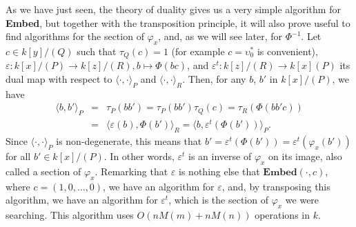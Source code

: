 \documentclass[a4paper,11pt]{article}
\theoremstyle{break}
\theoremstyle{definition}
\theoremstyle{remark}
\newcommand{\ps}[2]{\langle#1,#2\rangle}
\newcommand{\psdot}{\ps{\cdot}{\cdot}}
\begin{document}
As we have just seen, the theory of duality gives us a very simple algorithm for
\textbf{Embed}, but together with the transposition principle, it will also
prove useful to find algorithms for the section of $\varphi_x$, and, as we will
see later, for $\Phi^{-1}$. Let $c\in k[y]/(Q)$ such that $\tau_Q(c)=1$ (for
example $c=\upsilon^*_0$ is convenient), $\varepsilon:k[x]/(P)\to k[z]/(R),
b\mapsto \Phi(bc)$, and $\varepsilon^t:k[z]/(R)\to k[x](P)$ its dual map with
respect to $\psdot_P$ and $\psdot_R$. Then, for any $b$, $b'$ in $k[x]/(P)$, we
have
\[
\begin{array}{rcl}
  \ps{b}{b'}_P &=& \tau_P(bb') = \tau_P(bb')\tau_Q(c) = \tau_R(\Phi(bb'c))\\
  &=& \ps{\varepsilon(b)}{\Phi(b')}_R = \ps{b}{\varepsilon^t(\Phi(b'))}_P.
\end{array}
\]
Since $\psdot_P$ is non-degenerate, this means that 
$b'=\varepsilon^t(\Phi(b'))=\varepsilon^t(\varphi_x(b'))$ for all $b'\in 
k[x]/(P)$. In other words, $\varepsilon^t$ is an inverse of $\varphi_x$ on its 
image, also called a section of $\varphi_x$. Remarking that $\varepsilon$ is 
nothing else that $\textbf{Embed}(\cdot,c)$, where $c=(1,0,\dots,0)$, we have 
an algorithm for $\varepsilon$, and, by transposing this algorithm, we have an 
algorithm for $\varepsilon^t$, which is the section of $\varphi_x$ we were 
searching. This algorithm uses $O(nM(m)+nM(n))$ operations in $k$.
\end{document}
